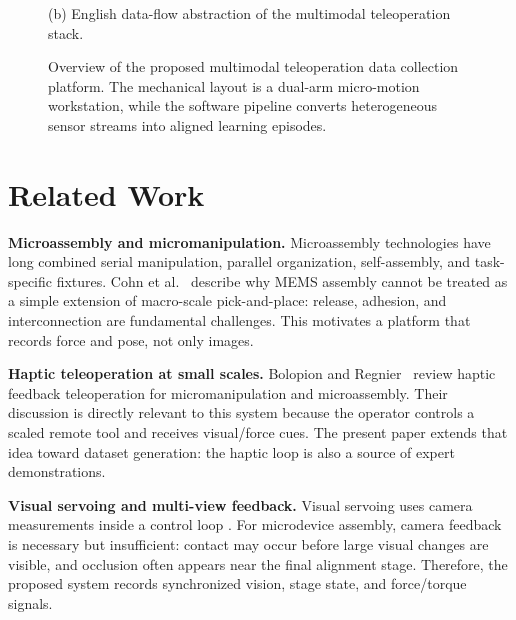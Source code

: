 \documentclass[10pt,twocolumn,letterpaper]{article}
\begin{document}
\begin{figure}[t]
\begin{minipage}[t]{0.42\textwidth}
{}
    \vspace{0.5mm}
    \parbox{0.95\linewidth}{\centering\small (b) English data-flow abstraction of the multimodal teleoperation stack.}
  \end{minipage}
  \caption{Overview of the proposed multimodal teleoperation data
  collection platform. The mechanical layout is a dual-arm micro-motion
  workstation, while the software pipeline converts heterogeneous sensor
  streams into aligned learning episodes.}
  \label{fig:overview}
\end{figure}

\section{Related Work}
\textbf{Microassembly and micromanipulation.}
Microassembly technologies have long combined serial manipulation,
parallel organization, self-assembly, and task-specific fixtures.
Cohn et al.~\cite{cohn1998microassembly} describe why MEMS assembly
cannot be treated as a simple extension of macro-scale pick-and-place:
release, adhesion, and interconnection are fundamental challenges.
This motivates a platform that records force and pose, not only images.

\textbf{Haptic teleoperation at small scales.}
Bolopion and Regnier~\cite{bolopion2013haptic} review haptic feedback
teleoperation for micromanipulation and microassembly. Their discussion
is directly relevant to this system because the operator controls a
scaled remote tool and receives visual/force cues. The present paper
extends that idea toward dataset generation: the haptic loop is also a
source of expert demonstrations.

\textbf{Visual servoing and multi-view feedback.}
Visual servoing uses camera measurements inside a control loop
\cite{chaumette2006visual}. For microdevice assembly, camera feedback is
necessary but insufficient: contact may occur before large visual changes
are visible, and occlusion often appears near the final alignment stage.
Therefore, the proposed system records synchronized vision, stage state,
and force/torque signals.
\end{document}
